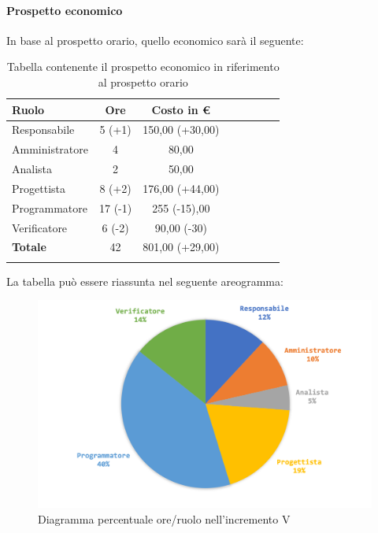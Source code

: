 			
		\paragraph{Prospetto economico}
			In base al prospetto orario, quello economico sarà il seguente: 
			
			\begin{longtable}{|l|c|c|c|c|c|c|c|}
				\hline
				\rowcolor{lighter-grayer}
				\textbf{Ruolo} & \textbf{Ore} & \textbf{Costo in €} \\
				\hline
				\endfirsthead
				\hline
				Responsabile 	    & 5 (+1) & 150,00 (+30,00)\\
				\hline 
				\hline
				Amministratore	  & 4 & 80,00\\
				\hline
				\hline
				Analista 				& 2 & 50,00\\
				\hline
				\hline
				Progettista 		  & 8 (+2) & 176,00 (+44,00)\\
				\hline
				\hline
				Programmatore 	 & 17 (-1)  & 255 (-15),00 \\
				\hline
				\hline
				Verificatore 		  & 6 (-2) & 90,00 (-30)\\
				\hline
				\textbf{Totale} 	&  42 & 801,00 (+29,00)\\
				\hline
					
				\caption{Tabella contenente il prospetto economico in riferimento al prospetto orario}
			\end{longtable}
			
			La tabella può essere riassunta nel seguente areogramma:
			\begin{figure}[H]
				\centering
				\includegraphics[width=0.8\linewidth]{images/consuntivo/ConsIncr5-2.png}
				\caption{Diagramma percentuale ore/ruolo nell'incremento V}
				\label{fig:consuntivo diagramma costi ruolo incremento V}
			\end{figure}
		\pagebreak
